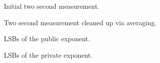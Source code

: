 \documentclass[a4paper,11pt]{article}
\begin{document}
\begin{figure} 
  \caption{Initial two second measurement.}
  \label{fig00}
\end{figure}
\begin{figure} 
  \caption{Two second measurement cleaned up via averaging.}
  \label{fig01}
\end{figure}
\begin{figure} 
  \caption{LSBs of the public exponent.}
  \label{fig02}
\end{figure}
\begin{figure} 
  \caption{LSBs of the private exponent.}
  \label{fig03}
\end{figure}
\end{document}
